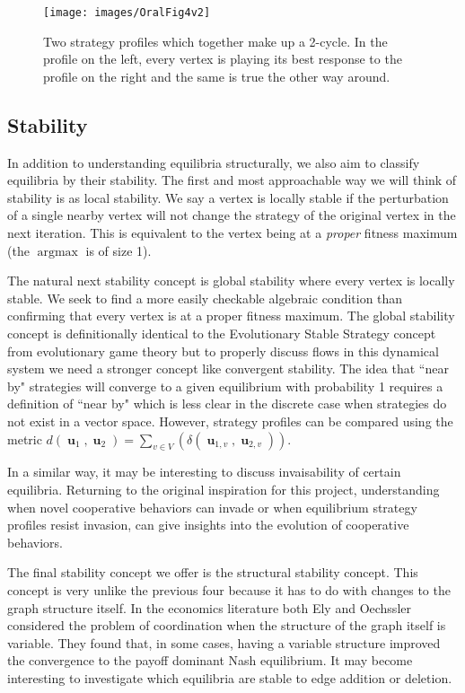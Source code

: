 \documentclass[]{article}
\DeclareMathOperator*{\argmax}{\text{argmax}}
\DeclareMathOperator{\uu}{\mathbf{u}}
\begin{document}
		\begin{figure}
			\texttt{[image: images/OralFig4v2]}
			\caption{Two strategy profiles which together make up a 2-cycle. In the profile on the left, every vertex is playing its best response to the profile on the right and the same is true the other way around.}
			\label{cycle} 
		\end{figure}
		\subsection{Stability}\label{stability}
		In addition to understanding equilibria structurally, we also aim to classify equilibria by their stability. The first and most approachable way we will think of stability is as local stability. We say a vertex is locally stable if the perturbation of a single nearby vertex will not change the strategy of the original vertex in the next iteration. This is equivalent to the vertex being at a \textit{proper} fitness maximum (the $\argmax$ is of size 1). 
		
		The natural next stability concept is global stability where every vertex is locally stable. We seek to find a more easily checkable algebraic condition than confirming that every vertex is at a proper fitness maximum. The global stability concept is definitionally identical to the Evolutionary Stable Strategy concept from evolutionary game theory\cite{Apaloo2009,Nowak2006} but to properly discuss flows in this dynamical system we need a stronger concept like convergent stability. The idea that ``near by" strategies will converge to a given equilibrium with probability 1 requires a definition of ``near by" which is less clear in the discrete case when strategies do not exist in a vector space. However, strategy profiles can be compared using the metric $d(\uu_1,\uu_2)=\sum_{v\in V}(\delta(\uu_{1,v},\uu_{2,v}))$.
		
		In a similar way, it may be interesting to discuss invaisability of certain equilibria. Returning to the original inspiration for this project, understanding when novel cooperative behaviors can invade or when equilibrium strategy profiles resist invasion, can give insights into the evolution of cooperative behaviors.
		
		The final stability concept we offer is the structural stability concept. This concept is very unlike the previous four because it has to do with changes to the graph structure itself. In the economics literature both Ely and Oechssler considered the problem of coordination when the structure of the graph itself is variable. They found that, in some cases, having a variable structure improved the convergence to the payoff dominant Nash equilibrium\cite{Ely2002,Oechssler1999,Oechssler1997}. %
		It may become interesting to investigate which equilibria are stable to edge addition or deletion. 
		
\end{document}
